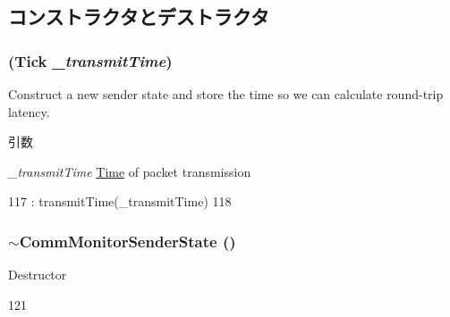 \subsection{コンストラクタとデストラクタ}
\hypertarget{classCommMonitor_1_1CommMonitorSenderState_ac479caf694f1ab2ffe5f06991fba167e}{
\subsubsection[{CommMonitorSenderState}]{ ({\bf Tick} {\em \_\-transmitTime})}}
\label{classCommMonitor_1_1CommMonitorSenderState_ac479caf694f1ab2ffe5f06991fba167e}
Construct a new sender state and store the time so we can calculate round-\/trip latency.


\begin{DoxyParams}{引数}
\item[{\em \_\-transmitTime}]\hyperlink{classTime}{Time} of packet transmission \end{DoxyParams}



\begin{DoxyCode}
117             : transmitTime(_transmitTime)
118         { }
\end{DoxyCode}
\hypertarget{classCommMonitor_1_1CommMonitorSenderState_aa0073f8734a0fbce7bf5ec9fcd4c0ca4}{
\subsubsection[{$\sim$CommMonitorSenderState}]{\setlength{\rightskip}{0pt plus 5cm}$\sim${\bf CommMonitorSenderState} ()}}
\label{classCommMonitor_1_1CommMonitorSenderState_aa0073f8734a0fbce7bf5ec9fcd4c0ca4}
Destructor 


\begin{DoxyCode}
121 { }
\end{DoxyCode}


